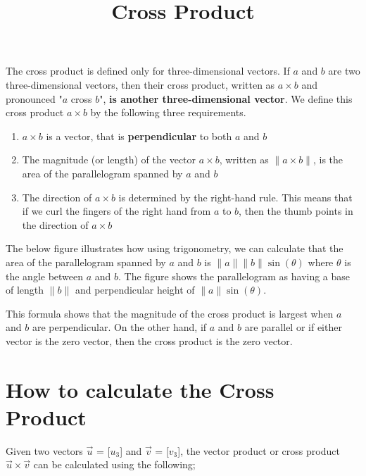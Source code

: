 \documentclass[12pt]{article}
\title{Cross Product}
\date{}
\begin{document}
    \maketitle

The cross product is defined only for three-dimensional vectors. If $a$ and $b$ are two three-dimensional vectors, then their cross product, written as $a \times b$ and pronounced "$a$ cross $b$", \textbf{is another three-dimensional vector}. We define this cross product $a \times b$ by the following three requirements.

\begin{enumerate}
    \item $a \times b$ is a vector, that is \textbf{perpendicular} to both $a$ and $b$
    \item The magnitude (or length) of the vector $a \times b$, written as $\| a \times b \|$, is the area of the parallelogram spanned by $a$ and $b$
    \item The direction of $a \times b$ is determined by the right-hand rule. This means that if we curl the fingers of the right hand from $a$ to $b$, then the thumb points in the direction of $a \times b$
\end{enumerate}

The below figure illustrates how using trigonometry, we can calculate that the area of the parallelogram spanned by $a$ and $b$ is $\| a \| \| b \| \sin(\theta)$ where $\theta$ is the angle between $a$ and $b$. The figure shows the parallelogram as having a base of length $\| b \|$ and perpendicular height of $\| a \| \sin(\theta)$.


This formula shows that the magnitude of the cross product is largest when $a$ and $b$ are perpendicular. On the other hand, if $a$ and $b$ are parallel or if either vector is the zero vector, then the cross product is the zero vector.


\section{How to calculate the Cross Product}

Given two vectors $\Vec{u}$ = [$u_3$] and $\Vec{v}$ = [$v_3$], the vector product or cross product $\Vec{u} \times \Vec{v}$ can be calculated using the following;
\end{document}
